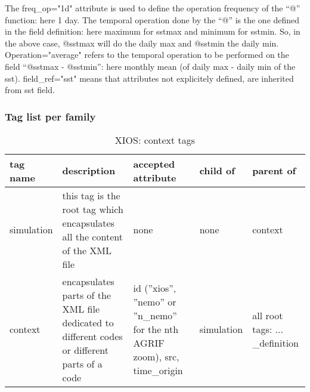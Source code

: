 \documentclass[../main/NEMO_manual]{subfiles}
\begin{document}
The freq\_op="1d" attribute is used to define the operation frequency of the ``@'' function: here 1 day.
The temporal operation done by the ``@'' is the one defined in the field definition:
here maximum for sstmax and minimum for sstmin.
So, in the above case, @sstmax will do the daily max and @sstmin the daily min.
Operation="average" refers to the temporal operation to be performed on the field ``@sstmax - @sstmin'':
here monthly mean (of daily max - daily min of the sst).
field\_ref="sst" means that attributes not explicitely defined, are inherited from sst field.

\subsubsection{Tag list per family}

\begin{table}
  \begin{tabularx}{\textwidth}{|l|X|X|l|X|}
    \hline
    tag name                                                                                     &
    description                                                                                  &
    accepted attribute                                                                           &
    child of                                                                                     &
    parent of                       \\
    \hline
    \hline
    simulation                                                                                   &
    this tag is the root tag which encapsulates all the content of the XML file                  &
    none                                                                                         &
    none                                                                                         &
    context                         \\
    \hline
    context                                                                                      &
    encapsulates parts of the XML file dedicated to different codes or different parts of a code &
    id (''xios'', ''nemo'' or ''n\_nemo'' for the nth AGRIF zoom), src, time\_origin             &
    simulation                                                                                   &
    all root tags: ... \_definition \\
    \hline
  \end{tabularx}
  \caption{XIOS: context tags}
\end{table}
\end{document}
